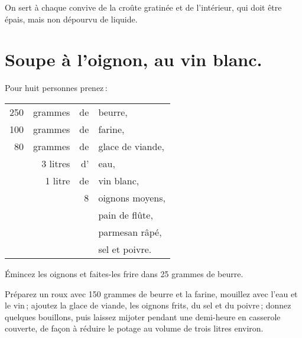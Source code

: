 On sert à chaque convive de la croûte gratinée et de l'intérieur, qui doit être
épais, mais non dépourvu de liquide.

\section*{\centering Soupe à l'oignon, au vin blanc.}

Pour huit personnes prenez :

\medskip

\footnotesize
\begin{longtable}{rrrp{16em}}                                                    
    250 & grammes  & de & beurre,                                                                         \\
    100 & grammes  & de & farine,                                                                         \\
     80 & grammes  & de & glace de viande,                                                                \\
        & 3 litres & d' & eau,                                                                            \\
        & 1 litre  & de & vin blanc,                                                                      \\
        &          &  8 & oignons moyens,                                                                 \\
        &          &    & pain de flûte,                                                                  \\
        &          &    & parmesan râpé,                                                                  \\
        &          &    & sel et poivre.                                                                  \\
\end{longtable}
\normalsize

Émincez les oignons et faites-les frire dans 25 grammes de beurre.

Préparez un roux avec 150 grammes de beurre et la farine, mouillez avec l'eau
et le vin ; ajoutez la glace de viande, les oignons frits, du sel et du
poivre ; donnez quelques bouillons, puis laissez mijoter pendant une demi-heure
en casserole couverte, de façon à réduire le potage au volume de trois litres
environ.

